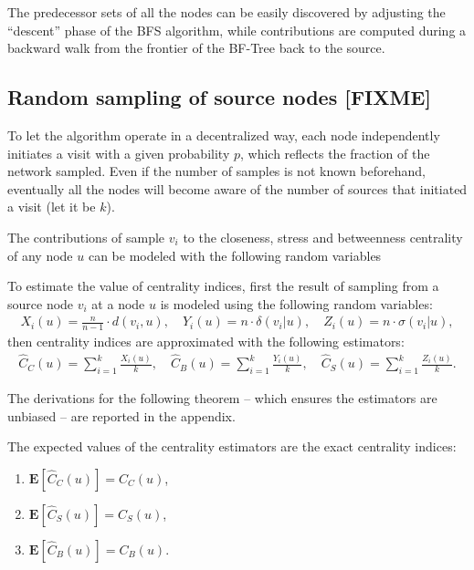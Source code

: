 The predecessor sets of all the nodes can be easily discovered by adjusting the ``descent'' phase of the BFS algorithm, while contributions are computed during a backward walk from the frontier of the BF-Tree back to the source.

\subsection{Random sampling of source nodes [FIXME]}

To let the algorithm operate in a decentralized way, each node independently initiates a visit with a given probability $p$, which reflects the fraction of the network sampled. Even if the number of samples is not known beforehand, eventually all the nodes will become aware of the number of sources that initiated a visit (let it be $k$).

The contributions of sample $v_i$ to the closeness, stress and betweenness centrality of any node $u$ can be modeled with the following random variables

To estimate the value of centrality indices, first the result of sampling from a source node $v_i$ at a node $u$ is modeled using the following random variables:
\begin{eqnarray*}
X_i(u) = \frac{n}{n-1} \cdot d(v_i,u) , \quad
Y_i(u) = n \cdot \delta(v_i|u) , \quad
Z_i(u) = n \cdot \sigma(v_i|u) ,
\end{eqnarray*}
then centrality indices are approximated with the following estimators:
\begin{eqnarray*}
\widehat{C}_C(u) = \sum_{i=1}^k \frac{X_i(u)}{k}, \quad
\widehat{C}_B(u) = \sum_{i=1}^k \frac{Y_i(u)}{k}, \quad
\widehat{C}_S(u) = \sum_{i=1}^k \frac{Z_i(u)}{k} .
\end{eqnarray*}

The derivations for the following theorem -- which ensures the estimators are unbiased -- are reported in the appendix.

\begin{theorem}
\label{th:expect}
The expected values of the centrality estimators are the exact centrality indices:
 \begin{enumerate}[label=\textup{(\alph*)}]
  \item $\mathbf{E}[\widehat{C}_C(u)] = C_C(u)$,
  \item $\mathbf{E}[\widehat{C}_S(u)] = C_S(u)$,
  \item $\mathbf{E}[\widehat{C}_B(u)] = C_B(u)$.
  \end{enumerate}
\end{theorem}

